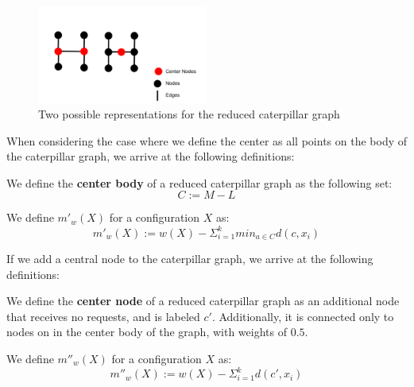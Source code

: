 \begin{figure}[H]
    \centering
    \includegraphics[width=0.5\textwidth]{images/center.png}
    \caption{Two possible representations for the reduced caterpillar graph}
    \label{fig:smallcat}
\end{figure}

When considering the case where we define the center as all points on the body of the caterpillar graph, we arrive at the following definitions:

\begin{definition}
     We define the \textbf{center body} of a reduced caterpillar graph as the following set:
        \begin{equation*}
            C := M - L
        \end{equation*}
\end{definition}

\begin{definition}
    We define $m'_w(X)$ for a configuration $X$ as:
    \begin{equation*}
        m'_w(X) := w(X) - \Sigma_{i=1} ^ k min_{a \in C} d(c, x_i)
    \end{equation*}
\end{definition}

If we add a central node to the caterpillar graph, we arrive at the following definitions:

\begin{definition}
    We define the \textbf{center node} of a reduced caterpillar graph as an additional node that receives no requests, and is labeled $c'$. Additionally, it is connected only to nodes on in the center body of the graph, with weights of $0.5$.
\end{definition}

\begin{definition}
    We define $m''_w(X)$ for a configuration $X$ as:
    \begin{equation*}
        m''_w(X) := w(X) - \Sigma_{i=1} ^ k d(c', x_i)
    \end{equation*}
\end{definition}


